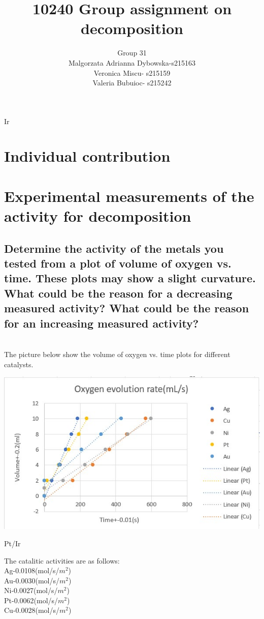 Ir\documentclass{article}
\title{10240 Group assignment on \ch{H2O2} decomposition}
\author{Group 31\\
Malgorzata Adrianna Dybowska-s215163\\
Veronica Miscu- s215159\\
Valeria Bubuioc- s215242}
\begin{document}
\maketitle

\section*{Individual contribution}

\section{Experimental measurements of the activity for  decomposition}

\subsection{Determine the activity of the metals you tested from a plot of volume of oxygen
vs. time. These plots may show a slight curvature. What could be the reason
for a decreasing measured activity? What could be the reason for an increasing
measured activity?} \\
The picture below show the volume of oxygen vs. time plots for different catalysts.\\
\begin{center}
\includegraphics[width=\textwidth,height=\textheight,keepaspectratio]{oxygennnnn.jpg}
\caption{Pt/Ir}
\end{center}

 The catalitic activities are as follows:\\
 Ag-0.0108(mol/s/$m^2$) \\
 Au-0.0030(mol/s/$m^2$) \\
 Ni-0.0027(mol/s/$m^2$) \\
 Pt-0.0062(mol/s/$m^2$) \\
 Cu-0.0028(mol/s/$m^2$) \\
\end{document}
